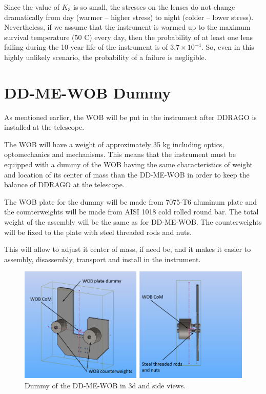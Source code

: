 \documentclass{report}
\begin{document}
Since the value of $K_3$ is so small, the stresses on the lenses do not change dramatically from day (warmer – higher stress) to night (colder – lower stress). Nevertheless, if we assume that the instrument is warmed up to the maximum survival temperature (50 C) every day, then the probability of at least one lens failing during the 10-year life of the instrument is of $3.7\times 10^{-4}$. So, even in this highly unlikely scenario, the probability of a failure is negligible.

\section{DD-ME-WOB Dummy}

As mentioned earlier, the WOB will be put in the instrument after DDRAGO is installed at the telescope.

The WOB will have a weight of approximately 35 kg including optics, optomechanics and mechanisms. This means that the instrument must be equipped with a dummy of the WOB having the same characteristics of weight and location of its center of mass than the DD-ME-WOB in order to keep the balance of DDRAGO at the telescope.

The WOB plate for the dummy will be made from 7075-T6 aluminum plate and the counterweights will be made from AISI 1018 cold rolled round bar. The total weight of the assembly will be the same as for DD-ME-WOB. The counterweights will be fixed to the plate with steel threaded rods and nuts.

This will allow to adjust it center of mass, if need be, and it makes it easier to assembly, disassembly, transport and install in the instrument.

\begin{figure}
\centering
\includegraphics[width=0.9\linewidth]{figures/WOB-dummy.png}
\caption{Dummy of the DD-ME-WOB in 3d and side views.}
\label{figure:WOB-dummy}
\end{figure}
\end{document}
